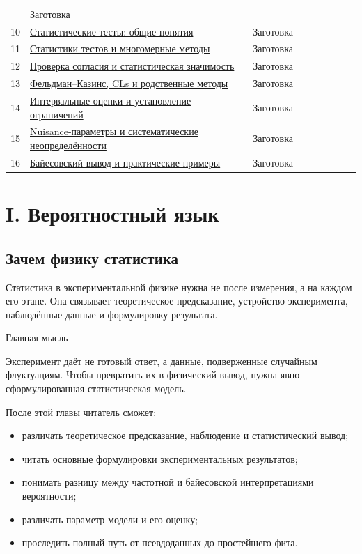 \documentclass[
  russian,
  letterpaper,
]{scrbook}
\providecommand{\tightlist}{%
  \setlength{\itemsep}{0pt}\setlength{\parskip}{0pt}}
\begin{document}
{\begin{longtable}[]
{квадратов} & Заготовка \\
10 & \href{chapters/09_statistical_tests_basics.qmd}{Статистические
тесты: общие понятия} & Заготовка \\
11 &
\href{chapters/10_test_statistics_and_multivariate_methods.qmd}{Статистики
тестов и многомерные методы} & Заготовка \\
12 & \href{chapters/11_goodness_of_fit_and_significance.qmd}{Проверка
согласия и статистическая значимость} & Заготовка \\
13 & \href{chapters/12_feldman_cousins_and_cls.qmd}{Фельдман--Казинс,
CLs и родственные методы} & Заготовка \\
14 & \href{chapters/13_interval_estimation_and_limits.qmd}{Интервальные
оценки и установление ограничений} & Заготовка \\
15 &
\href{chapters/14_nuisance_parameters_and_systematics.qmd}{Nuisance-параметры
и систематические неопределённости} & Заготовка \\
16 & \href{chapters/15_bayesian_examples.qmd}{Байесовский вывод и
практические примеры} & Заготовка \\
\end{longtable}
}

\part{I. Вероятностный язык}

\chapter{Зачем физику
статистика}\label{ux437ux430ux447ux435ux43c-ux444ux438ux437ux438ux43aux443-ux441ux442ux430ux442ux438ux441ux442ux438ux43aux430}

Статистика в экспериментальной физике нужна не после измерения, а на
каждом его этапе. Она связывает теоретическое предсказание, устройство
эксперимента, наблюдённые данные и формулировку результата.

{Главная мысль}

Эксперимент даёт не готовый ответ, а данные, подверженные случайным
флуктуациям. Чтобы превратить их в физический вывод, нужна явно
сформулированная статистическая модель.

После этой главы читатель сможет:

\begin{itemize}
\tightlist
\item
  различать теоретическое предсказание, наблюдение и статистический
  вывод;
\item
  читать основные формулировки экспериментальных результатов;
\item
  понимать разницу между частотной и байесовской интерпретациями
  вероятности;
\item
  различать параметр модели и его оценку;
\item
  проследить полный путь от псевдоданных до простейшего фита.
\end{itemize}
\end{document}
